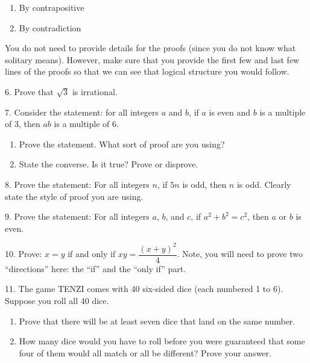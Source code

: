 \documentclass[10pt,]{book}
\theoremstyle{plain}
\theoremstyle{definition}
\numberwithin{equation}{chapter}
\begin{document}
\begin{exerciselist}
\begin{enumerate}[label=(\alph*)]
\item\hypertarget{li-686}{}
              By contrapositive


\item\hypertarget{li-687}{}
              By contradiction


\end{enumerate}
\par

          You do not need to provide details for the proofs (since you do not know what solitary means). However, make sure that you provide the first few and last few lines of the proofs so that we can see that logical structure you would follow.
\par\smallskip
\item[6.]\hypertarget{exercise-247}{}
          Prove that \(\sqrt 3\) is irrational.
\par\smallskip
\item[7.]\hypertarget{exercise-248}{}
          Consider the statement: for all integers \(a\) and \(b\), if \(a\) is even and \(b\) is a multiple of 3, then \(ab\) is a multiple of 6.
\leavevmode%
\begin{enumerate}[label=(\alph*)]
\item\hypertarget{li-688}{}
              Prove the statement. What sort of proof are you using?
\item\hypertarget{li-689}{}
              State the converse. Is it true? Prove or disprove.
\end{enumerate}
\par\smallskip
\item[8.]\hypertarget{exercise-249}{}
          Prove the statement: For all integers \(n\), if \(5n\) is odd, then \(n\) is odd. Clearly state the style of proof you are using.
\par\smallskip
\item[9.]\hypertarget{exercise-250}{}
          Prove the statement: For all integers \(a\), \(b\), and \(c\), if \(a^2 + b^2 = c^2\), then \(a\) or \(b\) is even.
\par\smallskip
\item[10.]\hypertarget{exercise-251}{}
          Prove: \(x=y\) if and only if \(xy=\dfrac{(x+y)^2}{4}\). Note, you will need to prove two ``directions'' here: the ``if'' and the ``only if'' part.
\par\smallskip
\item[11.]\hypertarget{exercise-252}{}
          The game TENZI comes with 40 six-sided dice (each numbered 1 to 6). Suppose you roll all 40 dice.
          \leavevmode%
\begin{enumerate}[label=(\alph*)]
\item\hypertarget{li-690}{} Prove that there will be at least seven dice that land on the same number.%
\item\hypertarget{li-691}{}
                How many dice would you have to roll before you were guaranteed that some four of them would all match or all be different? Prove your answer.
\end{enumerate}


\end{exerciselist}
\end{document}
